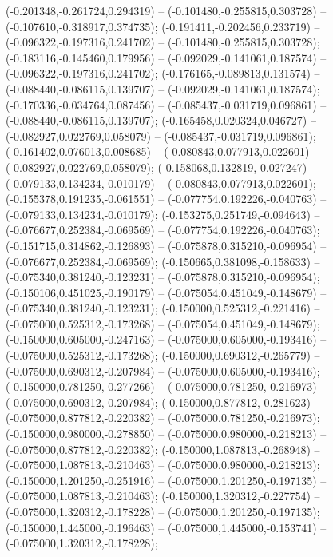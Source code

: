  (-0.201348,-0.261724,0.294319) -- (-0.101480,-0.255815,0.303728) -- (-0.107610,-0.318917,0.374735);
 (-0.191411,-0.202456,0.233719) -- (-0.096322,-0.197316,0.241702) -- (-0.101480,-0.255815,0.303728);
 (-0.183116,-0.145460,0.179956) -- (-0.092029,-0.141061,0.187574) -- (-0.096322,-0.197316,0.241702);
 (-0.176165,-0.089813,0.131574) -- (-0.088440,-0.086115,0.139707) -- (-0.092029,-0.141061,0.187574);
 (-0.170336,-0.034764,0.087456) -- (-0.085437,-0.031719,0.096861) -- (-0.088440,-0.086115,0.139707);
 (-0.165458,0.020324,0.046727) -- (-0.082927,0.022769,0.058079) -- (-0.085437,-0.031719,0.096861);
 (-0.161402,0.076013,0.008685) -- (-0.080843,0.077913,0.022601) -- (-0.082927,0.022769,0.058079);
 (-0.158068,0.132819,-0.027247) -- (-0.079133,0.134234,-0.010179) -- (-0.080843,0.077913,0.022601);
 (-0.155378,0.191235,-0.061551) -- (-0.077754,0.192226,-0.040763) -- (-0.079133,0.134234,-0.010179);
 (-0.153275,0.251749,-0.094643) -- (-0.076677,0.252384,-0.069569) -- (-0.077754,0.192226,-0.040763);
 (-0.151715,0.314862,-0.126893) -- (-0.075878,0.315210,-0.096954) -- (-0.076677,0.252384,-0.069569);
 (-0.150665,0.381098,-0.158633) -- (-0.075340,0.381240,-0.123231) -- (-0.075878,0.315210,-0.096954);
 (-0.150106,0.451025,-0.190179) -- (-0.075054,0.451049,-0.148679) -- (-0.075340,0.381240,-0.123231);
 (-0.150000,0.525312,-0.221416) -- (-0.075000,0.525312,-0.173268) -- (-0.075054,0.451049,-0.148679);
 (-0.150000,0.605000,-0.247163) -- (-0.075000,0.605000,-0.193416) -- (-0.075000,0.525312,-0.173268);
 (-0.150000,0.690312,-0.265779) -- (-0.075000,0.690312,-0.207984) -- (-0.075000,0.605000,-0.193416);
 (-0.150000,0.781250,-0.277266) -- (-0.075000,0.781250,-0.216973) -- (-0.075000,0.690312,-0.207984);
 (-0.150000,0.877812,-0.281623) -- (-0.075000,0.877812,-0.220382) -- (-0.075000,0.781250,-0.216973);
 (-0.150000,0.980000,-0.278850) -- (-0.075000,0.980000,-0.218213) -- (-0.075000,0.877812,-0.220382);
 (-0.150000,1.087813,-0.268948) -- (-0.075000,1.087813,-0.210463) -- (-0.075000,0.980000,-0.218213);
 (-0.150000,1.201250,-0.251916) -- (-0.075000,1.201250,-0.197135) -- (-0.075000,1.087813,-0.210463);
 (-0.150000,1.320312,-0.227754) -- (-0.075000,1.320312,-0.178228) -- (-0.075000,1.201250,-0.197135);
 (-0.150000,1.445000,-0.196463) -- (-0.075000,1.445000,-0.153741) -- (-0.075000,1.320312,-0.178228);
